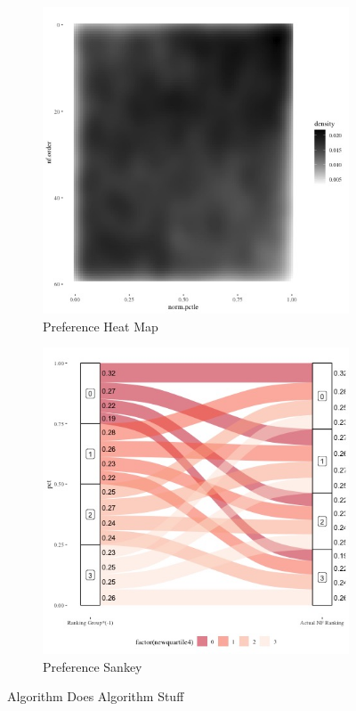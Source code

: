 \documentclass[12pt,letterpaper]{article}
\begin{document}
\begin{figure}[ht]
   \begin{subfigure}{.5\textwidth} 
        \centering
        \includegraphics[width=1\linewidth]{Output/Graphs/Audit/Heatmaps/US NF norm pref rank by nf rank - smooth.jpg}  
        \caption{Preference Heat Map}
        \label{fig:sub-first}
        \end{subfigure}
    \begin{subfigure}{.5\textwidth}
        \centering
        \includegraphics[width=1\linewidth]{Output/Graphs/Audit/Sankey flows/US NF norm quartile to actual.jpg}  
        \caption{Preference Sankey}
        \label{fig:sub-second}
    \end{subfigure}
    
\caption{Algorithm Does Algorithm Stuff}
\end{figure}
\end{document}
